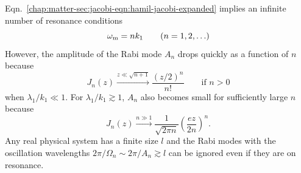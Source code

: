Eqn.~\ref{chap:matter-sec:jacobi-eqn:hamil-jacobi-expanded} implies an infinite number of resonance conditions
\begin{equation}
    \omega_\mm  = n k_1 \qquad (n=1, 2, \ldots)
    \label{chap:matter-sec:single-revisted-eqn:resonance-condition}
\end{equation}
However, the amplitude of the Rabi mode $A_n$ drops quickly as a function of $n$ because
\begin{equation}
    J_n(z) \xrightarrow{z\ll \sqrt{n+1}} \frac{ (z/2)^n }{n!} \qquad \text{if } n>0
    \label{chap:matter-sec:single-revisit-eqn:bessel-small-arg}
\end{equation}
when $\lambda_1/k_1 \ll 1$. For $\lambda_1/k_1\gtrsim 1$, $A_n$ also becomes small for sufficiently large $n$ because
\begin{equation}
    J_n(z) \xrightarrow{n\gg 1} \frac{1}{\sqrt{2\pi n}} \left( \frac{ e z }{ 2n } \right)^n.
\end{equation}
Any real physical system has a finite size $l$ and the Rabi modes with the oscillation wavelengths $2\pi/\Omega_n\sim 2\pi/A_n  \gtrsim l$ can be ignored even if they are on resonance.





